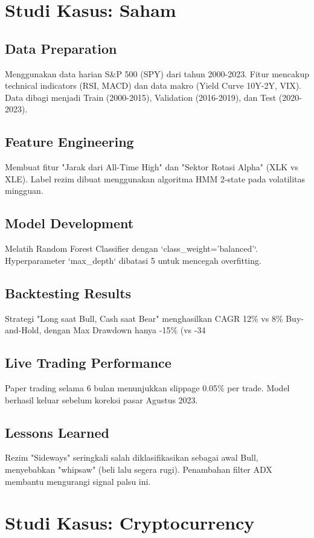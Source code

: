 \documentclass[12pt,a4paper]{book}
\begin{document}
\chapter{Studi Kasus: Saham}
\section{Data Preparation}
Menggunakan data harian S\&P 500 (SPY) dari tahun 2000-2023. Fitur mencakup technical indicators (RSI, MACD) dan data makro (Yield Curve 10Y-2Y, VIX). Data dibagi menjadi Train (2000-2015), Validation (2016-2019), dan Test (2020-2023).

\section{Feature Engineering}
Membuat fitur "Jarak dari All-Time High" dan "Sektor Rotasi Alpha" (XLK vs XLE). Label rezim dibuat menggunakan algoritma HMM 2-state pada volatilitas mingguan.

\section{Model Development}
Melatih Random Forest Classifier dengan `class_weight='balanced'`. Hyperparameter `max_depth` dibatasi 5 untuk mencegah overfitting.

\section{Backtesting Results}
Strategi "Long saat Bull, Cash saat Bear" menghasilkan CAGR 12\% vs 8\% Buy-and-Hold, dengan Max Drawdown hanya -15\% (vs -34%

\section{Live Trading Performance}
Paper trading selama 6 bulan menunjukkan slippage 0.05\% per trade. Model berhasil keluar sebelum koreksi pasar Agustus 2023.

\section{Lessons Learned}
Rezim "Sideways" seringkali salah diklasifikasikan sebagai awal Bull, menyebabkan "whipsaw" (beli lalu segera rugi). Penambahan filter ADX membantu mengurangi signal palsu ini.

\chapter{Studi Kasus: Cryptocurrency}
\end{document}
